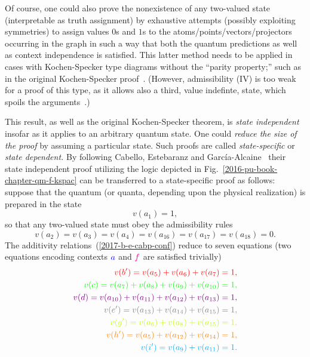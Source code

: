 \documentclass[%
  twocolumn,
 showpacs,
 showkeys,
 preprintnumbers,
 amsmath,amssymb,
 aps,
  pra,
  longbibliography,
 floatfix,
 ]{revtex4-1}
\begin{document}
Of course, one could also prove the nonexistence of any  two-valued state (interpretable as truth assignment)
by exhaustive attempts
(possibly exploiting symmetries) to assign values $0$s and $1$s to the atoms/points/vectors/projectors occurring in the graph
in such a way that both the quantum predictions as well as context independence is satisfied.
This latter method needs to be applied in cases with Kochen-Specker type diagrams without the  ``parity property;''
such as in the original Kochen-Specker proof~\cite{kochen1}.
(However, admissibility (IV) is too weak for a proof of this type,
as it allows also a third, value indefinte, state, which spoils the arguments~\cite{2015-AnalyticKS}.)

This result, as well as the original Kochen-Specker theorem,
is {\em state independent} insofar as it applies to an arbitrary quantum state.
One could {\em reduce the size of the proof} by assuming a particular state. Such proofs are called
{\em state-specific} or {\em state dependent.}
By following  Cabello, Estebaranz and Garc{\'{i}}a-Alcaine~\cite[Eqs.~(10)-(19), p.~185]{cabello-96}
their state independent proof utilizing the logic depicted in Fig.~\ref{2016-pu-book-chapter-qm-f-kspac}
can be transferred to a state-specific proof as follows:
suppose that the quantum (or quanta, depending upon the physical realization) is prepared in the state
\begin{equation}
v(a_1) = 1,
\label{2017-b-e-cabp2}
\end{equation}
so that any two-valued state must obey the admissibility rules
\begin{equation}
v(a_2)=v(a_3)=v(a_4)=v(a_{16}) =v(a_{17})=v(a_{18}) =0.
\label{2017-b-e-cabp3}
\end{equation}
The additivity relations~(\ref{2017-b-e-cabp-conf}) reduce to seven equations (two equations encoding contexts
${\color{blue}a}$ and ${\color{magenta}f}$ are satisfied trivially)
\begin{equation}
\begin{split}
\color{red}         v(b')=  v( a_5 ) + v( a_6 ) + v( a_7 ) = 1 ,                  \\
\color{green}       v(c)= v( a_7 ) + v( a_8 ) + v( a_9 ) + v( a_{10} ) = 1 ,               \\
\color{violet}      v(d)= v( a_{10} ) + v( a_{11} ) + v( a_{12} ) + v( a_{13} ) = 1 ,      \\
\color{gray}        v(e')= v( a_{13} ) + v( a_{14} ) + v( a_{15} ) = 1 ,      \\
\color{lime}        v(g')=  v( a_6 ) + v( a_8 ) + v( a_{15} ) = 1 ,            \\
\color{orange}      v(h')=  v( a_5 ) + v( a_{12} ) + v( a_{14} ) = 1 ,            \\
\color{cyan}        v(i')=  v( a_9 ) + v( a_{11} )  = 1 .
\label{2017-b-e-cabp-conf2}
\end{split}
\end{equation}
\end{document}

